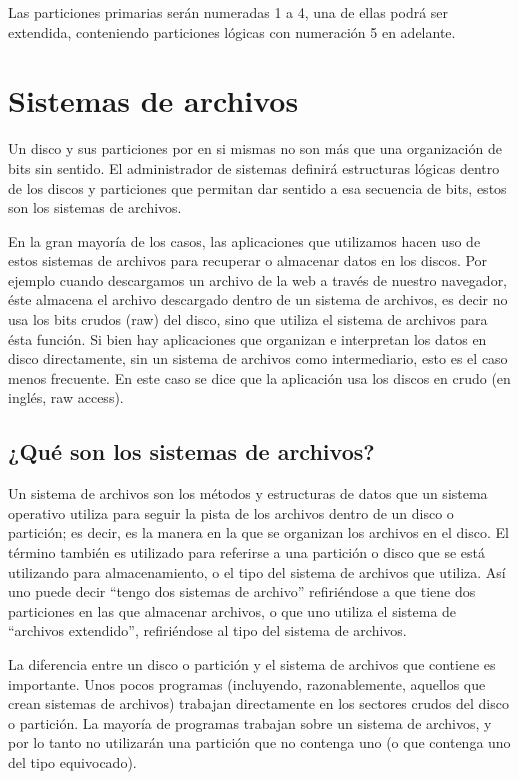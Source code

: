 \documentclass[12pt]{article}
\begin{document}
Las particiones primarias serán numeradas 1 a 4, una de ellas podrá ser 
extendida, conteniendo particiones lógicas con numeración 5 en adelante. 
 
\section*{Sistemas de archivos}

Un disco y sus particiones por en si mismas no son más que una organización
de bits sin sentido. El administrador de sistemas definirá estructuras 
lógicas dentro de los discos y particiones que permitan dar sentido a esa
secuencia de bits, estos son los sistemas de archivos. 

En la gran mayoría de los casos, las aplicaciones que utilizamos hacen uso 
de estos sistemas de archivos para recuperar o almacenar datos en los 
discos. Por ejemplo cuando descargamos un archivo de la web a través de 
nuestro navegador, éste almacena el archivo descargado dentro de un 
sistema de archivos, es decir no usa los bits crudos (raw) del disco, sino 
que utiliza el sistema de archivos para ésta función. Si bien hay 
aplicaciones que organizan e interpretan los datos en disco directamente, 
sin un sistema de archivos como intermediario, esto es el caso menos 
frecuente. En este caso se dice que la aplicación usa los discos en crudo 
(en inglés, raw access). 

\subsection*{¿Qué son los sistemas de archivos?}

Un sistema de archivos son los métodos y estructuras de datos que un 
sistema operativo utiliza para seguir la pista de los archivos dentro de 
un disco o partición; es decir, es la manera en la que se organizan los 
archivos en el disco. El término también es utilizado para referirse a una
partición o disco que se está utilizando para almacenamiento, o el tipo del
sistema de archivos que utiliza. Así uno puede decir ``tengo dos sistemas 
de archivo'' refiriéndose a que tiene dos particiones en las que almacenar
archivos, o que uno utiliza el sistema de ``archivos extendido'', 
refiriéndose al tipo del sistema de archivos.

La diferencia entre un disco o partición y el sistema de archivos que 
contiene es importante. Unos pocos programas (incluyendo, razonablemente, 
aquellos que crean sistemas de archivos) trabajan directamente en los 
sectores crudos del disco o partición. La mayoría de 
programas trabajan sobre un sistema de archivos, y por lo tanto no 
utilizarán una partición que no contenga uno (o que contenga uno del tipo 
equivocado).
\end{document}
